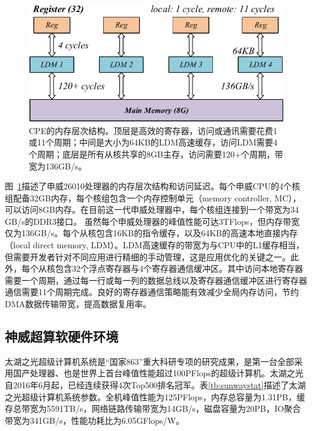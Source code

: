 \documentclass[degree=doctor]{thuthesis}
\begin{document}
\begin{figure}[ht]
\centering
\includegraphics[width=.8\columnwidth]{memory_hierarchy.pdf}
\caption{CPE的内存层次结构。顶层是高效的寄存器，访问或通讯需要花费1或11个周期；中间是大小为64KB的LDM高速缓存，访问LDM需要4个周期；底层是所有从核共享的8GB主存，访问需要120+个周期，带宽为136GB/s。}
\label{fig:sunway_mem}
\end{figure}

图~\ref {fig:sunway_mem}描述了申威26010处理器的内存层次结构和访问延迟。每个申威CPU的4个核组配备32GB内存，每个核组包含一个内存控制单元（memory controller, MC），可以访问8GB内存。在目前这一代申威处理器中，每个核组连接到一个带宽为34 GB/s的DDR3接口。 虽然每个申威处理器的峰值性能可达3TFlops，但内存带宽仅为136GB/s。每个从核包含16KB的指令缓存，以及64KB的高速本地直接内存（local direct memory, LDM）。LDM高速缓存的带宽为与CPU中的L1缓存相当，但需要开发者针对不同应用进行精细的手动管理，这是应用优化的关键之一。此外，每个从核包含32个浮点寄存器与4个寄存器通信缓冲区。其中访问本地寄存器需要一个周期，通过每一行或每一列的数据总线以及寄存器通信缓冲区进行寄存器通信需要11个周期完成。良好的寄存器通信策略能有效减少全局内存访问，节约DMA数据传输带宽，提高数据复用率。

\subsection{神威超算软硬件环境}
\label{sub:神威超算软硬件环境}
太湖之光超级计算机系统是“国家863”重大科研专项的研究成果，是第一台全部采用国产处理器、也是世界上首台峰值性能超过100PFlops的超级计算机。太湖之光自2016年6月起，已经连续获得4次Top500排名冠军。表\ref{tb:sunwaystat}描述了太湖之光超级计算机系统参数。全机峰值性能为125PFlops，内存总容量为1.31PB，缓存总带宽为5591TB/s，网络链路传输带宽为14GB/s，磁盘容量为20PB，IO聚合带宽为341GB/s，性能功耗比为6.05GFlops/W。


\begin{table}[h]
\centering
\caption{太湖之光超级计算机系统基础参数。}
\label{tb:sunwaystat}
\end{table}
\end{document}
